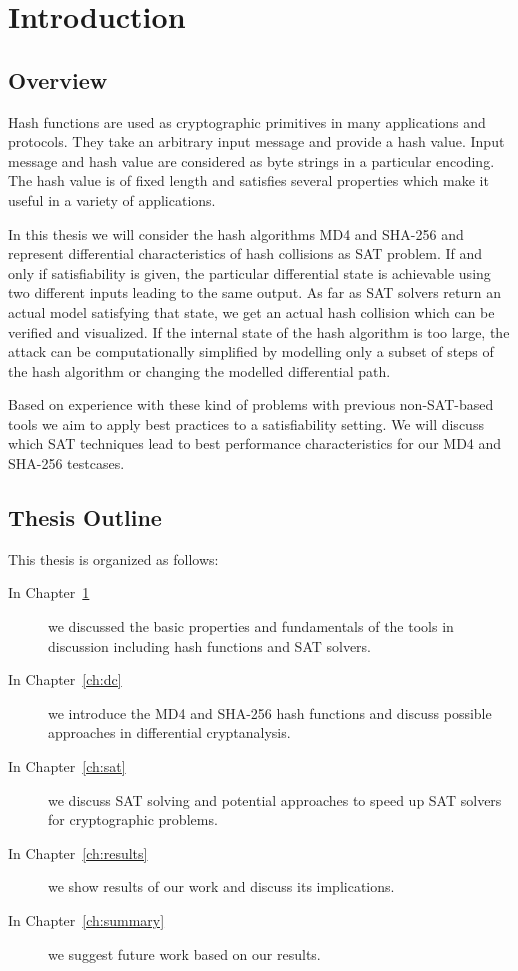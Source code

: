 \renewcommand*\chappic{img/intro.pdf}
\renewcommand*\chapquote{}
\renewcommand*\chapquotesrc{}
%
\chapter{Introduction}
\label{ch:intro}
\section{Overview}
\label{sec:intro-overview}
%
Hash functions are used as cryptographic primitives in many applications and protocols.
They take an arbitrary input message and provide a hash value. Input message and hash value
are considered as byte strings in a particular encoding.
The hash value is of fixed length and satisfies several properties which make it useful
in a variety of applications.

In this thesis we will consider the hash algorithms MD4 and SHA-256 and represent
differential characteristics of hash collisions as SAT problem. If and only if
satisfiability is given, the particular differential state is achievable
using two different inputs leading to the same output. As far as SAT solvers
return an actual model satisfying that state, we get an actual hash collision
which can be verified and visualized.
If the internal state of the hash algorithm is too large, the attack can be
computationally simplified by modelling only a subset of steps of the hash algorithm
or changing the modelled differential path.

Based on experience with these kind of problems with previous non-SAT-based tools
we aim to apply best practices to a satisfiability setting.
We will discuss which SAT techniques lead to best performance characteristics
for our MD4 and SHA-256 testcases.

\section{Thesis Outline}
\label{sec:intro-outline}
%
This thesis is organized as follows:

\begin{description}
\item[In Chapter~\ref{ch:intro}] we discussed the basic properties and fundamentals
of the tools in discussion including hash functions and SAT solvers.

\item[In Chapter~\ref{ch:dc}] we introduce the MD4 and SHA-256 hash functions and
discuss possible approaches in differential cryptanalysis.

\item[In Chapter~\ref{ch:sat}] we discuss SAT solving and potential
approaches to speed up SAT solvers for cryptographic problems.

\item[In Chapter~\ref{ch:results}] we show results of our work
and discuss its implications.

\item[In Chapter~\ref{ch:summary}] we suggest future work based on our results.
\end{description}
